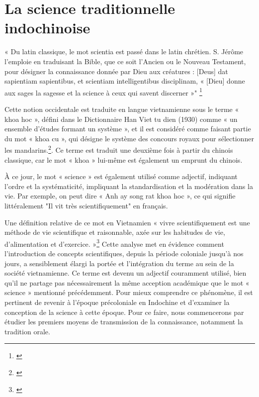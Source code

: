 \section{La science traditionnelle indochinoise}

« Du latin classique, le mot scientia est passé dans le latin chrétien. S. Jérôme l’emploie en traduisant la Bible, que ce soit l’Ancien ou le Nouveau Testament, pour désigner la connaissance donnée par Dieu aux créatures : [Deus] dat sapientiam sapientibus, et scientiam intelligentibus disciplinam, « [Dieu] donne aux sages la sagesse et la science à ceux qui savent discerner »" \footnote{\cite{science}}

Cette notion occidentale est traduite en langue vietnamienne sous le terme « khoa hoc », défini dans le Dictionnaire Han Viet tu dien (1930) comme « un ensemble d'études formant un système », et il est considéré comme faisant partie du mot « khoa cu », qui désigne le système des concours royaux pour sélectionner les mandarins.\footnote{\cite{khoa}}. Ce terme est traduit une deuxième fois à partir du chinois classique, car le mot « khoa » lui-même est également un emprunt du chinois.

À ce jour, le mot « science » est également utilisé comme adjectif, indiquant l'ordre et la systématicité, impliquant la standardisation et la modération dans la vie. Par exemple, on peut dire « Anh ay song rat khoa hoc », ce qui signifie littéralement "Il vit très scientifiquement" en français.

Une définition relative de ce mot en Vietnamien « vivre scientifiquement est une méthode de vie scientifique et raisonnable, axée sur les habitudes de vie, d’alimentation et d’exercice. »\footnote{\cite{khoahoc}}
Cette analyse met en évidence comment l'introduction de concepts scientifiques, depuis la période coloniale jusqu'à nos jours, a sensiblement élargi la portée et l'intégration du terme au sein de la société vietnamienne. Ce terme est devenu un adjectif couramment utilisé, bien qu'il ne partage pas nécessairement la même acception académique que le mot « science » mentionné précédemment. Pour mieux comprendre ce phénomène, il est pertinent de revenir à l'époque précoloniale en Indochine et d'examiner la conception de la science à cette époque. Pour ce faire, nous commencerons par étudier les premiers moyens de transmission de la connaissance, notamment la tradition orale.

